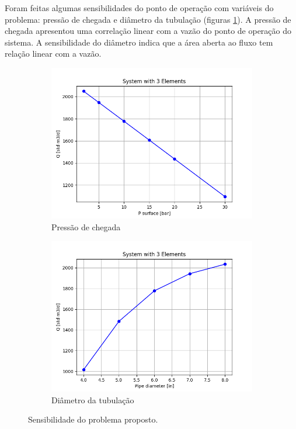 \documentclass[final,3p]{elsarticle}
\numberwithin{equation}{section}
\begin{document}
        Foram feitas algumas sensibilidades do ponto de operação com variáveis do problema: pressão de chegada e diâmetro da tubulação (figuras \ref{fig:sensibilidade}). A pressão de chegada apresentou uma correlação linear com a vazão do ponto de operação do sistema. A sensibilidade do diâmetro indica que a área aberta ao fluxo tem relação linear com a vazão.

        \begin{figure}
          \centering

          \begin{subfigure}{0.45\textwidth}
            \includegraphics[width=\textwidth]{flow/system1_p_out.png}
            \caption{Pressão de chegada}
          \end{subfigure}
          \hfill
          \begin{subfigure}{0.45\textwidth}
            \includegraphics[width=\textwidth]{flow/system1_d.png}
            \caption{Diâmetro da tubulação}
          \end{subfigure}

          \caption{Sensibilidade do problema proposto.}
          \label{fig:sensibilidade}
        \end{figure}
\end{document}

